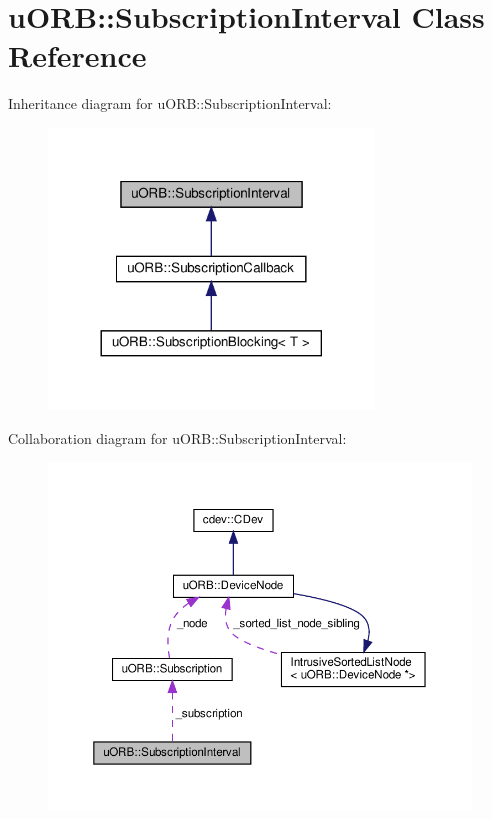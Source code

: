 \hypertarget{classuORB_1_1SubscriptionInterval}{}\section{u\+O\+RB\+:\+:Subscription\+Interval Class Reference}
\label{classuORB_1_1SubscriptionInterval}


Inheritance diagram for u\+O\+RB\+:\+:Subscription\+Interval\+:\nopagebreak
\begin{figure}[H]
\begin{center}
\leavevmode
\includegraphics[width=245pt]{dd/ded/classuORB_1_1SubscriptionInterval__inherit__graph}
\end{center}
\end{figure}


Collaboration diagram for u\+O\+RB\+:\+:Subscription\+Interval\+:\nopagebreak
\begin{figure}[H]
\begin{center}
\leavevmode
\includegraphics[width=350pt]{d2/d4f/classuORB_1_1SubscriptionInterval__coll__graph}
\end{center}
\end{figure}
